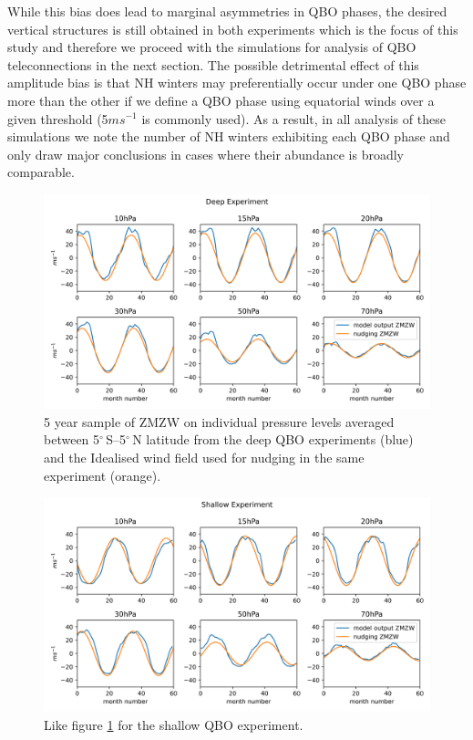 While this bias does lead to marginal asymmetries in QBO phases, the desired vertical structures is still obtained in both experiments which is the focus of this study and therefore we proceed with the simulations for analysis of QBO teleconnections in the next section. The possible detrimental effect of this amplitude bias is that NH winters may preferentially occur under one QBO phase more than the other if we define a QBO phase using equatorial winds over a given threshold (5$ms^{-1}$ is commonly used). As a result, in all analysis of these simulations we note the number of NH winters exhibiting each QBO phase and only draw major conclusions in cases where their abundance is broadly comparable. 

\begin{figure}[h!]
\begin{center}
\noindent\includegraphics[width = 0.95\linewidth]{Figures/Figures-deepQBO/winds_on_lev_nudging_deep.png}
\caption[Equatorial ZMZW on individual pressure levels in the deep QBO experiment]{5 year sample of ZMZW on individual pressure levels averaged between 5$^{\circ}$\,S--5$^{\circ}$\,N latitude from the deep QBO experiments (blue) and the Idealised wind field used for nudging in the same experiment (orange).}
\label{fig:winds_on_levs_deep}
\end{center}
\end{figure}

\begin{figure}[h!]
\begin{center}
\noindent\includegraphics[width = 0.95\linewidth]{Figures/Figures-deepQBO/winds_on_lev_nudging_shallow.png}
\caption[Equatorial ZMZW on individual pressure levels in the shallow QBO experiment]{Like figure \ref{fig:winds_on_levs_deep} for the shallow QBO experiment.}
\label{fig:winds_on_levs_shallow}
\end{center}
\end{figure}
\newpage


